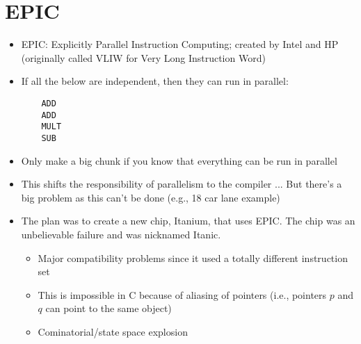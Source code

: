 \documentclass[twoside]{article}
\begin{document}
\section{EPIC}

\begin{itemize}

  \item EPIC: Explicitly Parallel Instruction Computing; created by Intel and HP (originally called VLIW for Very Long Instruction Word)
  \item If all the below are independent, then they can run in parallel:
	\begin{verbatim}
	ADD
	ADD
	MULT
	SUB
	\end{verbatim}
  \item Only make a big chunk if you know that everything can be run in parallel
  \item This shifts the responsibility of parallelism to the compiler ... But there's a big problem as this can't be done (e.g., 18 car lane example)
  \item The plan was to create a new chip, Itanium, that uses EPIC. The chip was an unbelievable failure and was nicknamed Itanic. 
	\begin{itemize}	
		\item Major compatibility problems since it used a totally different instruction set
		\item This is impossible in C because of aliasing of pointers (i.e., pointers $p$ and $q$ can point to the same object)
		\item Cominatorial/state space explosion
	\end{itemize}

\end{itemize}
\end{document}
